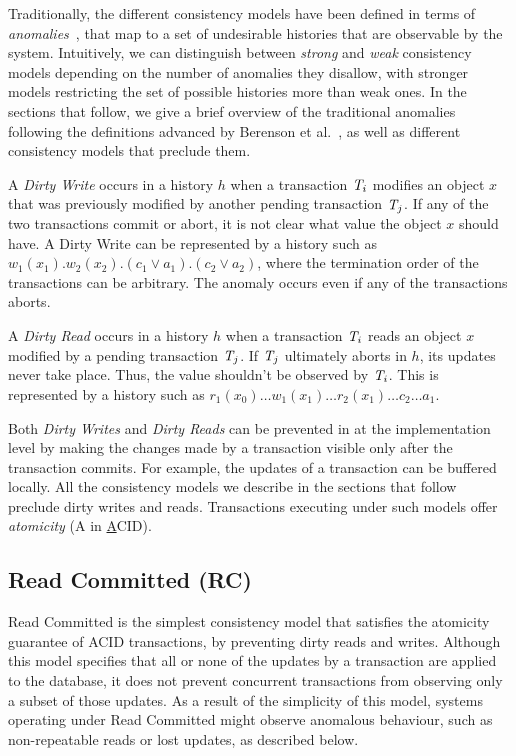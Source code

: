 Traditionally, the different consistency models have been defined in terms of \emph{anomalies}~\citep{sql-critique}, that map to a set of undesirable histories that are observable by the system. Intuitively, we can distinguish between \emph{strong} and \emph{weak} consistency models depending on the number of anomalies they disallow, with stronger models restricting the set of possible histories more than weak ones. In the sections that follow, we give a brief overview of the traditional anomalies following the definitions advanced by Berenson et al.~\citep{sql-critique}, as well as different consistency models that preclude them.

\begin{definition}
A \emph{Dirty Write} occurs in a history $h$ when a transaction $\mathit{T}_i$ modifies an object $x$ that was previously modified by another pending transaction $\mathit{T}_j$. If any of the two transactions commit or abort, it is not clear what value the object $x$ should have. A Dirty Write can be represented by a history such as $w_1(x_1).w_2(x_2).(c_1 \vee a_1).(c_2 \vee a_2)$, where the termination order of the transactions can be arbitrary. The anomaly occurs even if any of the transactions aborts.
\end{definition}

\begin{definition}
A \emph{Dirty Read} occurs in a history $h$ when a transaction $\mathit{T}_i$ reads an object $x$ modified by a pending transaction $\mathit{T}_j$. If $\mathit{T}_j$ ultimately aborts in $h$, its updates never take place. Thus, the value shouldn't be observed by $\mathit{T}_i$. This is represented by a history such as $r_1(x_0)\ldots w_1(x_1)\ldots r_2(x_1)\ldots c_2\ldots a_1$.
\end{definition}

Both \emph{Dirty Writes} and \emph{Dirty Reads} can be prevented in at the implementation level by making the changes made by a transaction visible only after the transaction commits. For example, the updates of a transaction can be buffered locally. All the consistency models we describe in the sections that follow preclude dirty writes and reads. Transactions executing under such models offer \emph{atomicity} (A in \underline{A}CID).

\subsection{Read Committed (RC)}

Read Committed is the simplest consistency model that satisfies the atomicity guarantee of ACID transactions, by preventing dirty reads and writes. Although this model specifies that all or none of the updates by a transaction are applied to the database, it does not prevent concurrent transactions from observing only a subset of those updates. As a result of the simplicity of this model, systems operating under Read Committed might observe anomalous behaviour, such as non-repeatable reads or lost updates, as described below.

